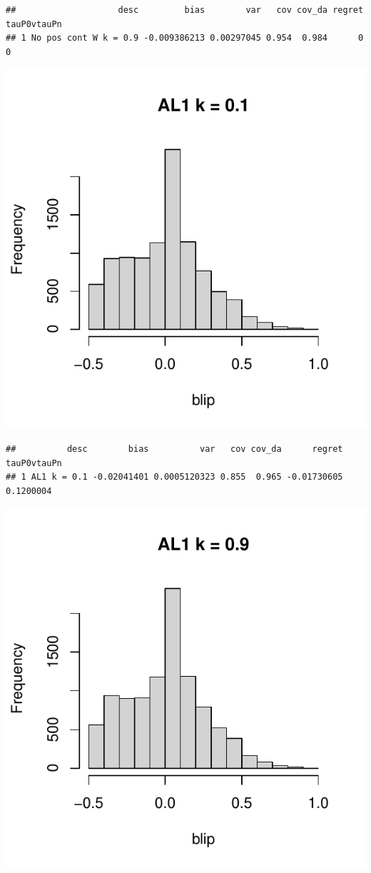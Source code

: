 \documentclass[11pt]{article}\usepackage[]{graphicx}\usepackage[table]{xcolor}
\makeatletter
\def\maxwidth{ %
  \ifdim\Gin@nat@width>\linewidth
    \linewidth
  \else
    \Gin@nat@width
  \fi
}
\newenvironment{kframe}{%
 \def\at@end@of@kframe{}%
 \ifinner\ifhmode%
  \def\at@end@of@kframe{\end{minipage}}%
  \begin{minipage}{\columnwidth}%
 \fi\fi%
 \def\FrameCommand##1{\hskip\@totalleftmargin \hskip-\fboxsep
 \colorbox{shadecolor}{##1}\hskip-\fboxsep
     \hskip-\linewidth \hskip-\@totalleftmargin \hskip\columnwidth}%
 \MakeFramed {\advance\hsize-\width
   \@totalleftmargin\z@ \linewidth\hsize
   \@setminipage}}%
 {\par\unskip\endMakeFramed%
 \at@end@of@kframe}
\newenvironment{knitrout}{}{} %
\makeatother
\begin{document}
\begin{knitrout}
\begin{kframe}\begin{verbatim}
##                    desc         bias        var   cov cov_da regret tauP0vtauPn
## 1 No pos cont W k = 0.9 -0.009386213 0.00297045 0.954  0.984      0           0
\end{verbatim}
\end{kframe}
\includegraphics[width=\maxwidth]{figure/unnamed-chunk-4-13} 
\begin{kframe}\begin{verbatim}
##          desc        bias          var   cov cov_da      regret tauP0vtauPn
## 1 AL1 k = 0.1 -0.02041401 0.0005120323 0.855  0.965 -0.01730605   0.1200004
\end{verbatim}
\end{kframe}
\includegraphics[width=\maxwidth]{figure/unnamed-chunk-4-14} 

\end{knitrout}
\end{document}
